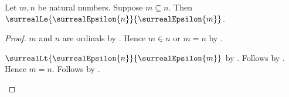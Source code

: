 \begin{corollary}\label{surreal_epsilon_antitone}
    Let $m,n$ be natural numbers.
    Suppose $m\subseteq n$.
    Then $\surrealLe{\surrealEpsilon{n}}{\surrealEpsilon{m}}$.
\end{corollary}
\begin{proof}
    $m$ and $n$ are ordinals by .
    Hence $m\in n$ or $m=n$ by
        .
    \begin{byCase}
            $\surrealLt{\surrealEpsilon{n}}{\surrealEpsilon{m}}$ by
                .
            Follows by
                .
            Hence $m=n$.
            Follows by
                .
    \end{byCase}
\end{proof}

